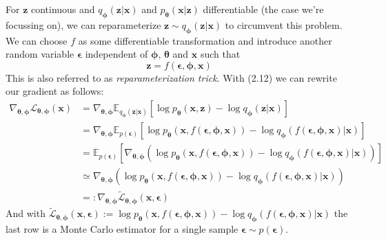 \documentclass[12pt]{report}
\theoremstyle{definition}
\begin{document}
For $\mathbf{z}$ continuous and $q_{\mathbf{\phi}}(\mathbf{z}|\mathbf{x})$ and $p_{\mathbf{\theta}}(\mathbf{x}|\mathbf{z})$ differentiable (the case we're focussing on), we can reparameterize $\mathbf{z} \sim q_{\mathbf{\phi}}(\mathbf{z}|\mathbf{x})$ to circumvent this problem. We can choose $f$ as some differentiable transformation and introduce another random variable $\pmb{\epsilon}$ independent of $\pmb{\phi}$, $\pmb{\theta}$ and $\mathbf{x}$ such that
\begin{equation}
\mathbf{z} = f(\pmb{\epsilon}, \pmb{\phi}, \mathbf{x})
\end{equation}
This is also referred to as \emph{reparameterization trick}. With (2.12) we can rewrite our gradient as follows:
\begin{equation}
\begin{split}
\nabla_{\pmb{\theta}, \pmb{\phi}}\mathcal{L}_{\pmb{\theta}, \pmb{\phi}}(\mathbf{x}) 
& = \nabla_{\pmb{\theta}, \pmb{\phi}} \mathbb{E}_{q_{\mathbf{\phi}}(\mathbf{z}|\mathbf{x})}\left[ \log p_{\mathbf{\theta}}(\mathbf{x}, \mathbf{z}) - \log q_{\mathbf{\phi}}(\mathbf{z}|\mathbf{x}) \right]	\\
& = \nabla_{\pmb{\theta}, \pmb{\phi}} \mathbb{E}_{p(\pmb{\epsilon})}\left[ \log p_{\mathbf{\theta}}(\mathbf{x}, f(\pmb{\epsilon}, \pmb{\phi}, \mathbf{x})) - \log q_{\mathbf{\phi}}(f(\pmb{\epsilon}, \pmb{\phi}, \mathbf{x})|\mathbf{x}) \right]	\\
& = \mathbb{E}_{p(\pmb{\epsilon})}\left[ \nabla_{\pmb{\theta}, \pmb{\phi}}(\log p_{\mathbf{\theta}}(\mathbf{x}, f(\pmb{\epsilon}, \pmb{\phi}, \mathbf{x})) - \log q_{\mathbf{\phi}}(f(\pmb{\epsilon}, \pmb{\phi}, \mathbf{x})|\mathbf{x})) \right]	\\
& \simeq \nabla_{\pmb{\theta}, \pmb{\phi}}(\log p_{\mathbf{\theta}}(\mathbf{x}, f(\pmb{\epsilon}, \pmb{\phi}, \mathbf{x})) - \log q_{\mathbf{\phi}}(f(\pmb{\epsilon}, \pmb{\phi}, \mathbf{x})|\mathbf{x})) \\
& =: \nabla_{\pmb{\theta}, \pmb{\phi}}\tilde{\mathcal{L}}_{\pmb{\theta}, \pmb{\phi}}(\mathbf{x}, \pmb{\epsilon})
\end{split}
\end{equation}
And with $\tilde{\mathcal{L}}_{\pmb{\theta}, \pmb{\phi}}(\mathbf{x}, \pmb{\epsilon}) := \log p_{\mathbf{\theta}}(\mathbf{x}, f(\pmb{\epsilon}, \pmb{\phi}, \mathbf{x})) - \log q_{\mathbf{\phi}}(f(\pmb{\epsilon}, \pmb{\phi}, \mathbf{x})|\mathbf{x})$ the last row is a Monte Carlo estimator for a single sample $\pmb{\epsilon} \sim p(\pmb{\epsilon})$. 
\end{document}
